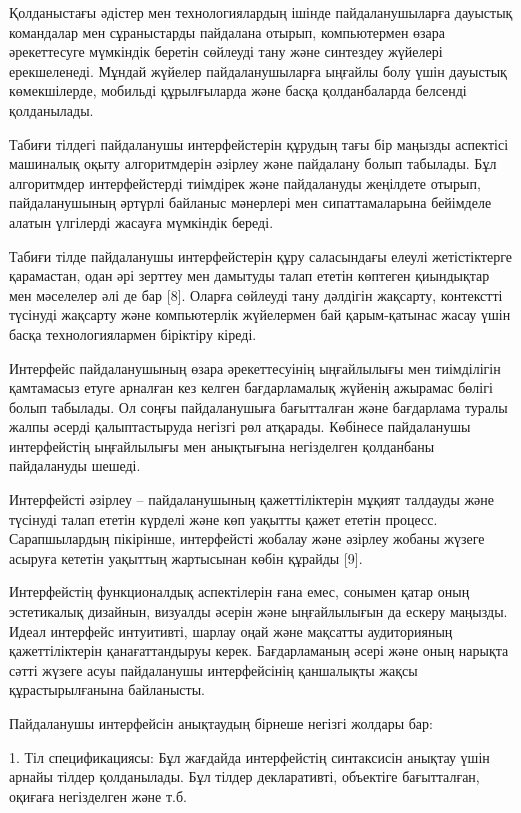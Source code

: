 Қолданыстағы әдістер мен технологиялардың ішінде пайдаланушыларға
дауыстық командалар мен сұраныстарды пайдалана отырып, компьютермен
өзара әрекеттесуге мүмкіндік беретін сөйлеуді тану және синтездеу
жүйелері ерекшеленеді. Мұндай жүйелер пайдаланушыларға ыңғайлы болу үшін
дауыстық көмекшілерде, мобильді құрылғыларда және басқа қолданбаларда
белсенді қолданылады.

Табиғи тілдегі пайдаланушы интерфейстерін құрудың тағы бір маңызды
аспектісі машиналық оқыту алгоритмдерін әзірлеу және пайдалану болып
табылады. Бұл алгоритмдер интерфейстерді тиімдірек және пайдалануды
жеңілдете отырып, пайдаланушының әртүрлі байланыс мәнерлері мен
сипаттамаларына бейімделе алатын үлгілерді жасауға мүмкіндік береді.

Табиғи тілде пайдаланушы интерфейстерін құру саласындағы елеулі
жетістіктерге қарамастан, одан әрі зерттеу мен дамытуды талап ететін
көптеген қиындықтар мен мәселелер әлі де бар {[}8{]}. Оларға сөйлеуді
тану дәлдігін жақсарту, контекстті түсінуді жақсарту және компьютерлік
жүйелермен бай қарым-қатынас жасау үшін басқа технологиялармен біріктіру
кіреді.

Интерфейс пайдаланушының өзара әрекеттесуінің ыңғайлылығы мен
тиімділігін қамтамасыз етуге арналған кез келген бағдарламалық жүйенің
ажырамас бөлігі болып табылады. Ол соңғы пайдаланушыға бағытталған және
бағдарлама туралы жалпы әсерді қалыптастыруда негізгі рөл атқарады.
Көбінесе пайдаланушы интерфейстің ыңғайлылығы мен анықтығына негізделген
қолданбаны пайдалануды шешеді.

Интерфейсті әзірлеу -- пайдаланушының қажеттіліктерін мұқият талдауды
және түсінуді талап ететін күрделі және көп уақытты қажет ететін
процесс. Сарапшылардың пікірінше, интерфейсті жобалау және әзірлеу
жобаны жүзеге асыруға кететін уақыттың жартысынан көбін құрайды {[}9{]}.

Интерфейстің функционалдық аспектілерін ғана емес, сонымен қатар оның
эстетикалық дизайнын, визуалды әсерін және ыңғайлылығын да ескеру
маңызды. Идеал интерфейс интуитивті, шарлау оңай және мақсатты
аудиторияның қажеттіліктерін қанағаттандыруы керек. Бағдарламаның әсері
және оның нарықта сәтті жүзеге асуы пайдаланушы интерфейсінің қаншалықты
жақсы құрастырылғанына байланысты.

Пайдаланушы интерфейсін анықтаудың бірнеше негізгі жолдары бар:

1. Тіл спецификациясы: Бұл жағдайда интерфейстің синтаксисін анықтау
үшін арнайы тілдер қолданылады. Бұл тілдер декларативті, объектіге
бағытталған, оқиғаға негізделген және т.б.

